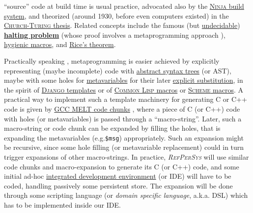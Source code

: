 \documentclass{IEEEtran}
\newcommand{\RefPerSys}{{\textit{\textsc{RefPerSys}}}}
\begin{document}
``source'' code at build time is usual practice, advocated also by the
\href{https://ninja-build.org/}{\textsc{Ninja} build system}, and
theorized (around 1930, before even computers existed) in the
\href{https://en.wikipedia.org/wiki/Church-Turing_thesis}{\textsc{Church-Turing}
  thesis}. Related concepts include the famous (but
\href{https://en.wikipedia.org/wiki/Undecidable_problem}{undecidable})
\href{https://en.wikipedia.org/wiki/Halting_problem}{\textbf{halting
    problem}} (whose proof involves a metaprogramming approach
\cite{Hofstadter:1979:GEB}),
\href{https://en.wikipedia.org/wiki/Hygienic_macro}{hygienic macros},
and \href{https://en.wikipedia.org/wiki/Rice's_theorem}{Rice's
  theorem}.

Practically speaking \cite{abelson:1996:sicp}, metaprogramming is
easier achieved by explicitly representing (maybe incomplete) code
with
\href{https://en.wikipedia.org/wiki/Abstract_syntax_tree}{abstract
  syntax trees}   (or  AST), maybe with some holes for
\href{https://en.wikipedia.org/wiki/Metavariable}{metavariables} for
their later
\href{https://en.wikipedia.org/wiki/Explicit_substitution}{explicit
  substitution}, in the spirit of
\href{https://docs.djangoproject.com/en/2.2/topics/templates/}{\textsc{Django}
  templates} or of
\href{https://lispcookbook.github.io/cl-cookbook/macros.html}{\textsc{Common
    Lisp} macros} or
\href{https://en.wikibooks.org/wiki/Scheme_Programming/Macros}{\textsc{Scheme}
  macros}. A practical way to implement such a template machinery for
generating C or C++ code is given by
\href{https://gcc.gnu.org/wiki/MELT tutorial}{\textsc{GCC MELT} code
  chunks} \cite{Starynkevitch-DSL2011, Starynkevitch-GCCMELTweb,
  Starynkevitch:2009:grow, Starynkevitch:2007:Multistage}, where a
piece of C (or C++) code with holes (or metavariables)
is passed through a ``macro-string''.
Later, such a macro-string or code chunk can be expanded by filling
the holes, that is expanding the metavariables (e.g.\texttt{\$msg})
appropriately. Such an expansion might be recursive, since some hole
filling (or metavariable replacement) could in turn trigger expansions
of other macro-strings. In practice, {\RefPerSys} will use similar
code chunks and macro-expansion to generate its C (or C++) code, and
some initial ad-hoc
\href{https://en.wikipedia.org/wiki/Integrated_development_environment}{integrated
  development environment} 
(or  IDE) will have to be coded, handling passively some
persistent store. The expansion will be done through some scripting
language (or \emph{domain specific language}, a.k.a. DSL) which has to
be implemented inside our IDE.
\end{document}

